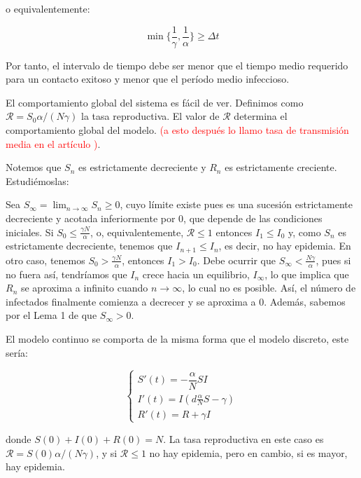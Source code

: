 o equivalentemente:

$$\min{\bigg\{ \frac{1}{\gamma}, \frac{1}{\alpha} \bigg\} } \geq \Delta t$$

Por tanto, el intervalo de tiempo debe ser menor que el tiempo medio requerido para un contacto exitoso y menor que el período medio infeccioso.

El comportamiento global del sistema es fácil de ver. Definimos como $\mathcal{R}=S_0 \alpha/(N\gamma )$ la tasa reproductiva. El valor de $\mathcal{R}$ determina el comportamiento global del modelo. \textcolor{red}{(a esto después lo llamo tasa de transmisión media en el artículo \cite{demongeotSIEpidemicModel})}. 

Notemos que $S_n$ es estrictamente decreciente y $R_n$ es estrictamente creciente. Estudiémoslas:

Sea $S_\infty=\lim_{n\rightarrow\infty} S_n\geq 0$, cuyo límite existe pues es una sucesión estrictamente decreciente y acotada inferiormente por $0$, que depende de las condiciones iniciales. Si $S_0\leq \frac{\gamma N}{\alpha}$, o, equivalentemente, $\mathcal{R}\leq 1$ entonces $I_1\leq I_0$ y, como $S_n$ es estrictamente decreciente, tenemos que $I_{n+1}\leq I_n$, es decir, no hay epidemia. En otro caso, tenemos $S_0> \frac{\gamma N}{\alpha}$, entonces $I_1>I_0$. Debe ocurrir que $S_\infty <\frac{N\gamma}{\alpha}$, pues si no fuera así, tendríamos que $I_n$ crece hacia un equilibrio, $I_\infty$, lo que implica que $R_n$ se aproxima a infinito cuando $n\rightarrow\infty$, lo cual no es posible. Así, el número de infectados finalmente comienza a decrecer y se aproxima a $0$. Además, sabemos por el Lema 1 de \cite{allenDiscretetimeSISIR1994} que $S_\infty>0$.

El modelo continuo se comporta de la misma forma que el modelo discreto, este sería:

\begin{equation}
\label{eqn: modelo_SIR_continuo}
\begin{cases}
S'(t) = -\dfrac{\alpha}{N}SI \\
I'(t) = I\left(d\frac{\alpha}{N}S-\gamma \right) \\
R'(t) = R+\gamma I
\end{cases}
\end{equation}

donde $S(0)+I(0)+R(0)=N$. La tasa reproductiva en este caso es $\mathcal{R}=S(0)\alpha /(N\gamma )$, y si $\mathcal{R}\leq 1$  no hay epidemia, pero en cambio, si es mayor, hay epidemia.

